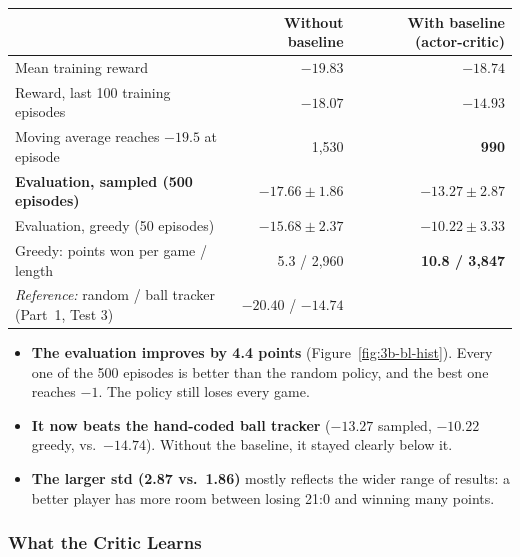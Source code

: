 \begin{center}
\small
\begin{tabular}{@{}lrr@{}}
  \toprule
  & \textbf{Without baseline} & \textbf{With baseline (actor-critic)} \\
  \midrule
  Mean training reward & $-19.83$ & $\mathbf{-18.74}$ \\
  Reward, last 100 training episodes & $-18.07$ & $\mathbf{-14.93}$ \\
  Moving average reaches $-19.5$ at episode & 1,530 & \textbf{990} \\
  \textbf{Evaluation, sampled (500 episodes)} & $\mathbf{-17.66 \pm 1.86}$ & $\mathbf{-13.27 \pm 2.87}$ \\
  Evaluation, greedy (50 episodes) & $-15.68 \pm 2.37$ & $\mathbf{-10.22 \pm 3.33}$ \\
  Greedy: points won per game / length & 5.3 / 2,960 & \textbf{10.8 / 3,847} \\
  \emph{Reference:} random / ball tracker (Part~1, Test 3) & $-20.40$ / $-14.74$ & \\
  \bottomrule
\end{tabular}
\end{center}

\begin{itemize}
  \item \textbf{The evaluation improves by 4.4 points} (Figure~\ref{fig:3b-bl-hist}). Every one of the 500 episodes is better than the random policy, and the best one reaches $-1$. The policy still loses every game.
  \item \textbf{It now beats the hand-coded ball tracker} ($-13.27$ sampled, $-10.22$ greedy, vs.\ $-14.74$). Without the baseline, it stayed clearly below it.
  \item \textbf{The larger std (2.87 vs.\ 1.86)} mostly reflects the wider range of results: a better player has more room between losing 21:0 and winning many points.
\end{itemize}

\subsubsection{What the Critic Learns}


